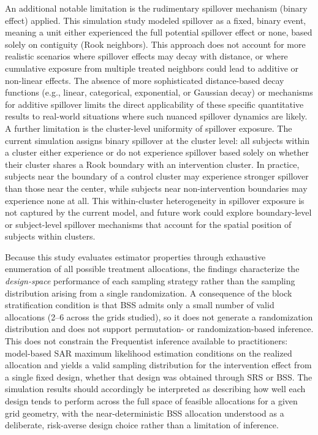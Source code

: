 \documentclass{article}[11pt]
\begin{document}
An additional notable limitation is the rudimentary spillover mechanism (binary effect) applied. This simulation study modeled spillover as a fixed, binary event, meaning a unit either experienced the full potential spillover effect or none, based solely on contiguity (Rook neighbors). This approach does not account for more realistic scenarios where spillover effects may decay with distance, or where cumulative exposure from multiple treated neighbors could lead to additive or non-linear effects. The absence of more sophisticated distance-based decay functions (e.g., linear, categorical, exponential, or Gaussian decay) or mechanisms for additive spillover limits the direct applicability of these specific quantitative results to real-world situations where such nuanced spillover dynamics are likely. %
A further limitation is the cluster-level uniformity of spillover exposure. The current simulation assigns binary spillover at the cluster level: all subjects within a cluster either experience or do not experience spillover based solely on whether their cluster shares a Rook boundary with an intervention cluster. In practice, subjects near the boundary of a control cluster may experience stronger spillover than those near the center, while subjects near non-intervention boundaries may experience none at all. This within-cluster heterogeneity in spillover exposure is not captured by the current model, and future work could explore boundary-level or subject-level spillover mechanisms that account for the spatial position of subjects within clusters.

Because this study evaluates estimator properties through exhaustive enumeration of all possible treatment allocations, the findings characterize the \emph{design-space} performance of each sampling strategy rather than the sampling distribution arising from a single randomization. A consequence of the block stratification condition is that BSS admits only a small number of valid allocations (2--6 across the grids studied), so it does not generate a randomization distribution and does not support permutation- or randomization-based inference. This does not constrain the Frequentist inference available to practitioners: model-based SAR maximum likelihood estimation conditions on the realized allocation and yields a valid sampling distribution for the intervention effect from a single fixed design, whether that design was obtained through SRS or BSS. The simulation results should accordingly be interpreted as describing how well each design tends to perform across the full space of feasible allocations for a given grid geometry, with the near-deterministic BSS allocation understood as a deliberate, risk-averse design choice rather than a limitation of inference.
\end{document}
